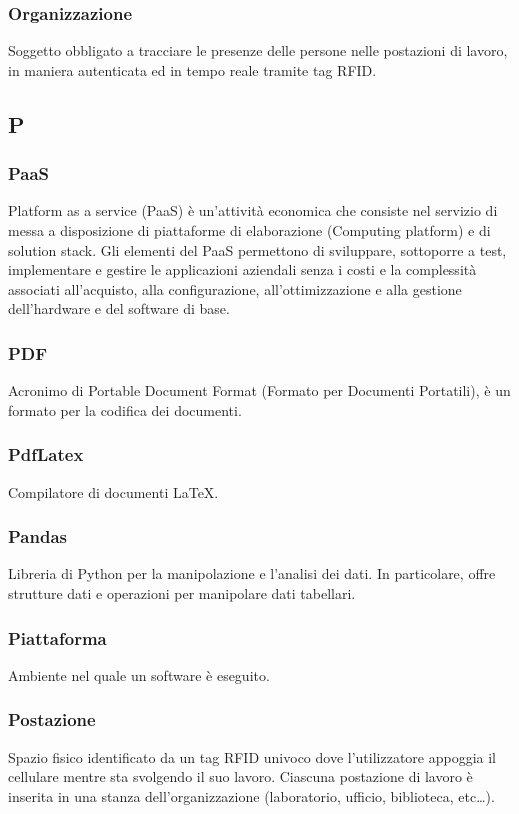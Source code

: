 \subsubsection*{Organizzazione} Soggetto obbligato a tracciare le presenze delle persone nelle postazioni di lavoro, in maniera autenticata ed in tempo reale tramite tag RFID. 
\subsection*{P}
\subsubsection*{PaaS} Platform as a service (PaaS) è un'attività economica che consiste nel servizio di messa a disposizione di piattaforme di elaborazione (Computing platform) e di solution stack. Gli elementi del PaaS permettono di sviluppare, sottoporre a test, implementare e gestire le applicazioni aziendali senza i costi e la complessità associati all'acquisto, alla configurazione, all'ottimizzazione e alla gestione dell'hardware e del software di base.
\subsubsection*{PDF} Acronimo di Portable Document Format (Formato per Documenti Portatili), è un formato per la codifica dei documenti.
\subsubsection*{PdfLatex} Compilatore di documenti \LaTeX.
\subsubsection*{Pandas} Libreria di Python per la manipolazione e l'analisi dei dati. In particolare, offre strutture dati e operazioni per manipolare dati tabellari.
\subsubsection*{Piattaforma} Ambiente nel quale un software è eseguito.
\subsubsection*{Postazione} Spazio fisico identificato da un tag RFID univoco dove l’utilizzatore appoggia il cellulare mentre sta svolgendo il suo lavoro. Ciascuna postazione di lavoro è inserita in una stanza
dell'organizzazione (laboratorio, ufficio, biblioteca, etc\dots).
